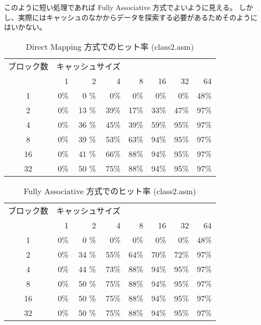 \documentclass[11pt,dvipdfmx,a4paper]{jsarticle}
\begin{document}
このように短い処理であれば Fully Associative 方式でよいように見える。
しかし、実際にはキャッシュのなかからデータを探索する必要があるためそのようにはいかない。
\begin{table}[H]
    \centering
    \caption{Direct Mapping 方式でのヒット率 (class2.asm)}
    \label{table:03}
    \begin{tabular}{crrrrrrr}
        \hline
        ブロック数 & \multicolumn{3}{l}{キャッシュサイズ} &    &    &    &     \\
              & 1 & 2  & 4 & 8 & 16 & 32 & 64 \\
              \hline
        1     & 0\% & 0 \% & 0\%  & 0\%  & 0\%  & 0\%  & 48\% \\
        2     & 0\% & 13 \% & 39\% & 17\% & 33\% & 47\% & 97\% \\
        4     & 0\% & 36 \% & 45\% & 39\% & 59\% & 95\% & 97\% \\
        8     & 0\% & 39 \% & 53\% & 63\% & 94\% & 95\% & 97\% \\
        16    & 0\% & 41 \% & 66\% & 88\% & 94\% & 95\% & 97\% \\
        32    & 0\% & 50 \% & 75\% & 88\% & 94\% & 95\% & 97\% \\
        \hline
        \end{tabular}
\end{table}

\begin{table}[H]
    \centering
    \caption{Fully Associative 方式でのヒット率 (class2.asm)}
    \label{table:04}
    \begin{tabular}{crrrrrrr}
        \hline
        ブロック数 & \multicolumn{3}{l}{キャッシュサイズ} &    &    &    &     \\
              & 1 & 2  & 4 & 8 & 16 & 32 & 64 \\
              \hline
        1     & 0\% & 0 \% & 0\%  & 0\%  & 0\%  & 0\%  & 48\% \\
        2     & 0\% & 34 \% & 55\% & 64\% & 70\% & 72\% & 97\% \\
        4     & 0\% & 44 \% & 73\% & 88\% & 94\% & 95\% & 97\% \\
        8     & 0\% & 50 \% & 75\% & 88\% & 94\% & 95\% & 97\% \\
        16    & 0\% & 50 \% & 75\% & 88\% & 94\% & 95\% & 97\% \\
        32    & 0\% & 50 \% & 75\% & 88\% & 94\% & 95\% & 97\% \\
        \hline
        \end{tabular}
\end{table}
\end{document}
